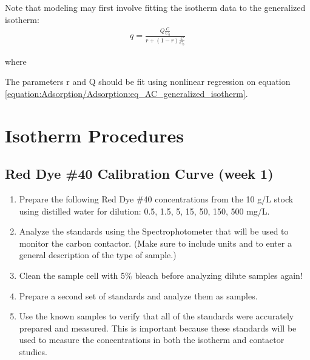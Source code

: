 \documentclass[letterpaper,10pt,english]{sphinxmanual}
\begin{document}
Note that modeling may first involve fitting the isotherm data to the generalized isotherm:
\begin{equation}\label{equation:Adsorption/Adsorption:eq_AC_generalized_isotherm}
\begin{split}q=\frac{Q\frac{C}{C_0}}{r+(1-r)\frac{C}{C_0}}\end{split}
\end{equation}\begin{description}
\item[{where}] \leavevmode
{}

\end{description}

The parameters r and Q should be fit using nonlinear regression on equation \eqref{equation:Adsorption/Adsorption:eq_AC_generalized_isotherm}.


\section{Isotherm Procedures}
\label{\detokenize{Adsorption/Adsorption:isotherm-procedures}}\label{\detokenize{Adsorption/Adsorption:heading-adsorption-isotherm-procedures}}

\subsection{Red Dye \#40 Calibration Curve (week 1)}
\label{\detokenize{Adsorption/Adsorption:red-dye-40-calibration-curve-week-1}}\begin{enumerate}
\item {} 
Prepare the following Red Dye \#40 concentrations from the 10 g/L stock using distilled water for dilution: 0.5, 1.5, 5, 15, 50, 150, 500 mg/L.

\item {} 
Analyze the standards using the Spectrophotometer that will be used to monitor the carbon contactor. (Make sure to include units and to enter a general description of the type of sample.)

\item {} 
Clean the sample cell with 5\% bleach before analyzing dilute samples again!

\item {} 
Prepare a second set of standards and analyze them as samples.

\item {} 
Use the known samples to verify that all of the standards were accurately prepared and measured. This is important because these standards will be used to measure the concentrations in both the isotherm and contactor studies.

\end{enumerate}
\end{document}
